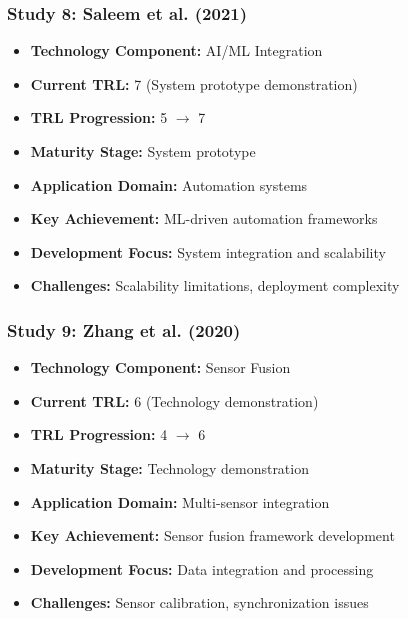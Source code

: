 \documentclass[11pt]{article}
\begin{document}
\subsubsection{Study 8: Saleem et al. (2021) \cite{saleem2021automation}}
\begin{itemize}
    \item \textbf{Technology Component:} AI/ML Integration
    \item \textbf{Current TRL:} 7 (System prototype demonstration)
    \item \textbf{TRL Progression:} 5 $\rightarrow$ 7
    \item \textbf{Maturity Stage:} System prototype
    \item \textbf{Application Domain:} Automation systems
    \item \textbf{Key Achievement:} ML-driven automation frameworks
    \item \textbf{Development Focus:} System integration and scalability
    \item \textbf{Challenges:} Scalability limitations, deployment complexity
\end{itemize}

\subsubsection{Study 9: Zhang et al. (2020) \cite{zhang2020state}}
\begin{itemize}
    \item \textbf{Technology Component:} Sensor Fusion
    \item \textbf{Current TRL:} 6 (Technology demonstration)
    \item \textbf{TRL Progression:} 4 $\rightarrow$ 6
    \item \textbf{Maturity Stage:} Technology demonstration
    \item \textbf{Application Domain:} Multi-sensor integration
    \item \textbf{Key Achievement:} Sensor fusion framework development
    \item \textbf{Development Focus:} Data integration and processing
    \item \textbf{Challenges:} Sensor calibration, synchronization issues
\end{itemize}
\end{document}

